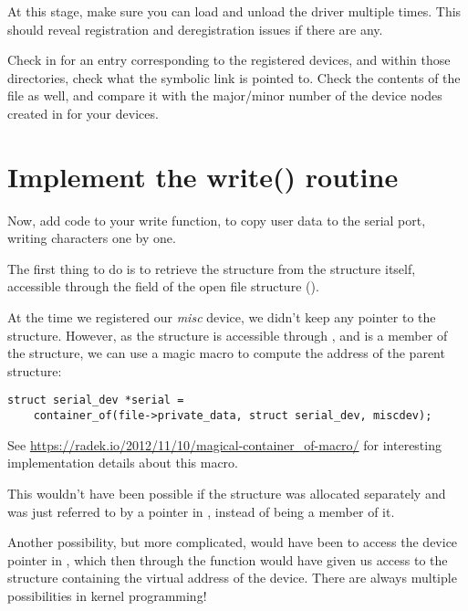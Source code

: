 At this stage, make sure you can load and unload the driver multiple
times. This should reveal registration and deregistration issues if
there are any.

Check in  for an entry corresponding to the
registered devices, and within those directories, check what the
 symbolic link is pointed to. Check the contents of the
 file as well, and compare it with the major/minor number of
the device nodes created in  for your devices.

\section{Implement the write() routine}

Now, add code to your write function, to copy user data to the serial
port, writing characters one by one.

The first thing to do is to retrieve the  structure
from the  structure itself, accessible through the
 field of the open file structure ().

At the time we registered our {\em misc} device, we didn't keep any
pointer to the  structure. However, as the
 structure is accessible through
, and is a member of the
 structure, we can use a magic macro to compute
the address of the parent structure:

\begin{verbatim}
struct serial_dev *serial =
	container_of(file->private_data, struct serial_dev, miscdev);
\end{verbatim}

See \url{https://radek.io/2012/11/10/magical-container_of-macro/}
for interesting implementation details about this macro.

This wouldn't have been possible if the  structure
was allocated separately and was just referred to by a pointer in
, instead of being a member of it.

Another possibility, but more complicated, would have been to access the
 device pointer in , which then through
the  function would
have given us access to the  structure containing the
virtual address of the device. There are always multiple possibilities
in kernel programming!

